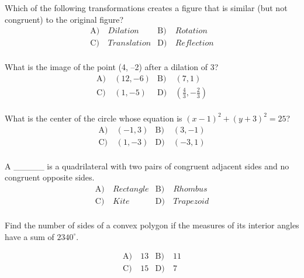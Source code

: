 \begin{problem}\label{Geo16}
 Which of the following transformations creates a figure that is similar (but not congruent) to the original figure?
\begin{align*}
\text{A)}\ & Dilation &
\text{B)}\ & Rotation  \\
\text{C)}\ & Translation &
\text{D)}\ & Reflection\\
\end{align*}    
\end{problem}


\begin{problem}\label{Geo17}
What is the image of the point (4, –2) after a dilation of 3?
\begin{align*}
\text{A)}\ & (12,-6) &
\text{B)}\ & (7,1)  \\
\text{C)}\ & (1,-5) &
\text{D)}\ & (\frac{4}{3},-\frac{2}{3})\\
\end{align*}    
\end{problem}



\begin{problem}\label{Geo20}
What is the center of the circle whose equation is $(x-1)^2+(y+3)^2=25$?
\begin{align*}
\text{A)}\ & (-1,3) &
\text{B)}\ & (3,-1)  \\
\text{C)}\ & (1,-3) &
\text{D)}\ & (-3,1)\\
\end{align*}    
\end{problem}


\begin{problem}\label{Geo21}
A \_\_\_\_\_ is a quadrilateral with two pairs of congruent adjacent sides and no congruent opposite sides.
\begin{align*}
\text{A)}\ & Rectangle &
\text{B)}\ & Rhombus  \\
\text{C)}\ & Kite &
\text{D)}\ & Trapezoid\\
\end{align*}    
\end{problem}


\begin{problem}\label{Geo23}
 Find the number of sides of a convex polygon if the measures of its interior angles have a sum of $2340^{\circ}$.

\begin{align*}
\text{A)}\ & 13 &
\text{B)}\ & 11  \\
\text{C)}\ & 15 &
\text{D)}\ & 7\\
\end{align*}    
\end{problem}


